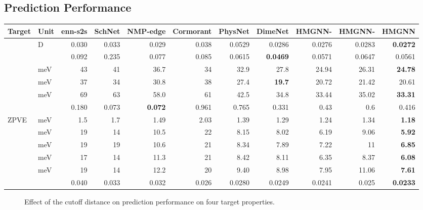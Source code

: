 \documentclass[conference]{IEEEtran}
\begin{document}
\subsection{Prediction Performance}

\begin{table*}[t]
\begin{center}
\begin{tabular}{l|l|rrrrrr|rrr}
\toprule
Target & Unit & enn-s2s & SchNet & NMP-edge & Cormorant & PhysNet & DimeNet & HMGNN- & HMGNN- & HMGNN \\
\midrule
 & D & 0.030 & 0.033 & 0.029 & 0.038 & 0.0529 & 0.0286 & 0.0276	& 0.0283 & \textbf{0.0272} \\
 &  & 0.092 & 0.235 & 0.077 & 0.085 & 0.0615 & \textbf{0.0469} & 0.0571 & 0.0647 & 0.0561 \\
 &  meV & 43 & 41 & 36.7 & 34 & 32.9 & 27.8 & 24.94 & 26.31 & \textbf{24.78}  \\
 & meV & 37 & 34 & 30.8 & 38 & 27.4 & \textbf{19.7} & 20.72 & 21.42 & 20.61 \\
 &  meV & 69 & 63 & 58.0 & 61 & 42.5 & 34.8 & 33.44  & 35.02 & \textbf{33.31} \\
 &   & 0.180 & 0.073 & \textbf{0.072} & 0.961 & 0.765 & 0.331 & 0.43 & 0.6 & 0.416 \\
ZPVE & meV & 1.5 & 1.7 & 1.49 & 2.03 & 1.39 & 1.29 & 1.24 & 1.34 &	\textbf{1.18} \\
 & meV & 19 & 14 & 10.5 & 22 & 8.15 & 8.02 & 6.19 & 9.06 & \textbf{5.92} \\
 & meV & 19 & 19 & 10.6 & 21 & 8.34 & 7.89 & 7.22 & 11 & \textbf{6.85} \\
 & meV & 17 & 14 & 11.3 & 21 & 8.42 & 8.11 & 6.35 & 8.37 & \textbf{6.08} \\
 & meV & 19 & 14 & 12.2 & 20 & 9.40 & 8.98 & 7.95 & 11.06 & \textbf{7.61} \\
 &  & 0.040 & 0.033 & 0.032 & 0.026 & 0.0280 & 0.0249 & 0.0241 & 0.025 & \textbf{0.0233} \\
\bottomrule
\end{tabular}
\label{Table:Result}
\end{center}
\end{table*}

\begin{figure*}[t]
\centering
{}

\caption{Effect of the cutoff distance  on prediction performance on four target properties. }
\label{fig:cut_r}
\end{figure*}
\end{document}
